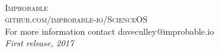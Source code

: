 \documentclass[11pt,fleqn]{book} %
\begin{document}

\newpage
~\vfill
\thispagestyle{empty}


\noindent \textsc{Improbable}\\

\noindent \textsc{github.com/improbable-io/ScienceOS}\\ %

\noindent 
For more information contact daveculley@improbable.io\\ %

\noindent \textit{First release, 2017} %



\pagestyle{empty} %

\tableofcontents %


\pagestyle{fancy} %











\end{document}
